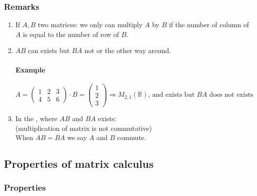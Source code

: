 \documentclass[notitlepage]{math}
\begin{document}
\subsubsection{Remarks}
\begin{enumerate}[label=\protect\circled{R\arabic*}]
    \item If $A,B$ two matrices: we only can multiply $A$ by $B$ if the number of column of $A$ is equal to the number of row of $B$.
    \item $AB$ can exists but $BA$ not or the other way around.
        \paragraph{Example}
        \[A = \begin{pmatrix}
            1 & 2 & 3\\
            4 & 5 & 6
        \end{pmatrix} \cdot B = \begin{pmatrix}
            1 \\
            2 \\
            3
        \end{pmatrix} \Rightarrow M_{2,1}(\mathbb{R}) \text{, and exists but } BA \text{ does not exists}\]
    \item In the , where $AB$ and $BA$ exists:\\
    {} (multiplication of matrix is not commutative)\\
    When $AB = BA$ we say $A$ and $B$ commute. 
\end{enumerate}
\subsection{Properties of matrix calculus}
\subsubsection{Properties}
\end{document}
